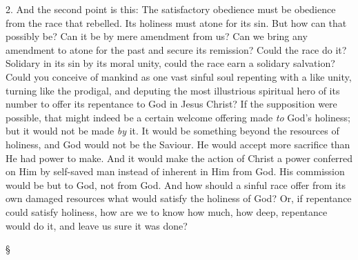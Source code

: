 \documentclass[12pt,a5paper,twoside,titlepage]{book}
\begin{document}
2. And the second point is this: The satisfactory 
obedience must be obedience from the race 
that rebelled. Its holiness must atone for its sin. 
But how can that possibly be? Can it be by mere 
amendment from us? Can we bring any amendment 
to atone for the past and secure its 
remission? Could the race do it? Solidary in 
its sin by its moral unity, could the race earn a 
solidary salvation? Could you conceive of mankind 
as one vast sinful soul repenting with a 
like unity, turning like the prodigal, and deputing 
the most illustrious spiritual hero of its number 
to offer its repentance to God in Jesus Christ? If 
the supposition were possible, that might indeed 
be a certain welcome offering made \textit{to} God's 
holiness; but it would not be made \textit{by} it. It 
would be something beyond the resources of 
holiness, and God would not be the Saviour. 
He would accept more sacrifice than He had 
power to make. And it would make the action 
of Christ a power conferred on Him by self-saved 
man instead of inherent in Him from 
God. His commission would be but to God, not 
from God. And how should a sinful race offer 
from its own damaged resources what would 
satisfy the holiness of God? Or, if repentance 
could satisfy holiness, how are we to know how 
much, how deep, repentance would do it, and 
leave us sure it was done? 

\begin{center}
\S
\end{center}
\end{document}
